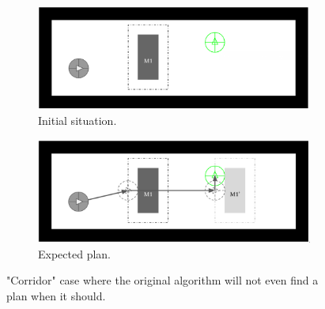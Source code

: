 \begin{figure}[H]
\centering
\begin{subfigure}{.5\textwidth}
  \centering
  \includegraphics[width=\linewidth]{Figures/Check_New_Opening/corridor_original.png}
  \caption{Initial situation.}
  \label{fig:corridor_original}
\end{subfigure}%
\begin{subfigure}{.5\textwidth}
  \centering
  \includegraphics[width=\linewidth]{Figures/Check_New_Opening/corridor_optimal_path.png}
  \caption{Expected plan.}
  \label{fig:corridor_optimal_path}
\end{subfigure}
\caption{"Corridor" case where the original algorithm will not even find a plan when it should.}
\label{fig:corridor_case}
\end{figure}

